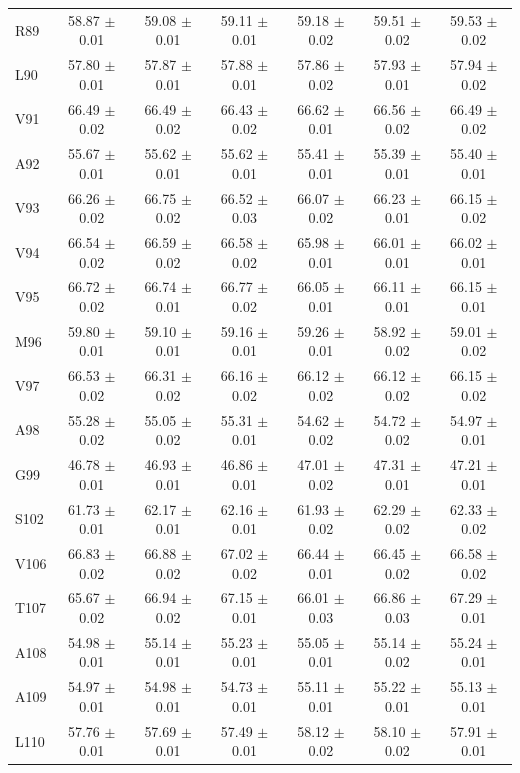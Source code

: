 \documentclass[%
 aip,
 amsmath,amssymb,
 preprint,%
]{revtex4-1}
\begin{document}
\begin{center}
\begin{longtable}{l|c|c|c|c|c|c}
R89 & 58.87 $\pm$ 0.01 & 59.08 $\pm$ 0.01 & 59.11 $\pm$ 0.01 & 59.18 $\pm$ 0.02 & 59.51 $\pm$ 0.02 & 59.53 $\pm$ 0.02 \\
L90 & 57.80 $\pm$ 0.01 & 57.87 $\pm$ 0.01 & 57.88 $\pm$ 0.01 & 57.86 $\pm$ 0.02 & 57.93 $\pm$ 0.01 & 57.94 $\pm$ 0.02 \\
V91 & 66.49 $\pm$ 0.02 & 66.49 $\pm$ 0.02 & 66.43 $\pm$ 0.02 & 66.62 $\pm$ 0.01 & 66.56 $\pm$ 0.02 & 66.49 $\pm$ 0.02 \\
A92 & 55.67 $\pm$ 0.01 & 55.62 $\pm$ 0.01 & 55.62 $\pm$ 0.01 & 55.41 $\pm$ 0.01 & 55.39 $\pm$ 0.01 & 55.40 $\pm$ 0.01 \\
V93 & 66.26 $\pm$ 0.02 & 66.75 $\pm$ 0.02 & 66.52 $\pm$ 0.03 & 66.07 $\pm$ 0.02 & 66.23 $\pm$ 0.01 & 66.15 $\pm$ 0.02 \\
V94 & 66.54 $\pm$ 0.02 & 66.59 $\pm$ 0.02 & 66.58 $\pm$ 0.02 & 65.98 $\pm$ 0.01 & 66.01 $\pm$ 0.01 & 66.02 $\pm$ 0.01 \\
V95 & 66.72 $\pm$ 0.02 & 66.74 $\pm$ 0.01 & 66.77 $\pm$ 0.02 & 66.05 $\pm$ 0.01 & 66.11 $\pm$ 0.01 & 66.15 $\pm$ 0.01 \\
M96 & 59.80 $\pm$ 0.01 & 59.10 $\pm$ 0.01 & 59.16 $\pm$ 0.01 & 59.26 $\pm$ 0.01 & 58.92 $\pm$ 0.02 & 59.01 $\pm$ 0.02 \\
V97 & 66.53 $\pm$ 0.02 & 66.31 $\pm$ 0.02 & 66.16 $\pm$ 0.02 & 66.12 $\pm$ 0.02 & 66.12 $\pm$ 0.02 & 66.15 $\pm$ 0.02 \\
A98 & 55.28 $\pm$ 0.02 & 55.05 $\pm$ 0.02 & 55.31 $\pm$ 0.01 & 54.62 $\pm$ 0.02 & 54.72 $\pm$ 0.02 & 54.97 $\pm$ 0.01 \\
G99 & 46.78 $\pm$ 0.01 & 46.93 $\pm$ 0.01 & 46.86 $\pm$ 0.01 & 47.01 $\pm$ 0.02 & 47.31 $\pm$ 0.01 & 47.21 $\pm$ 0.01 \\
S102 & 61.73 $\pm$ 0.01 & 62.17 $\pm$ 0.01 & 62.16 $\pm$ 0.01 & 61.93 $\pm$ 0.02 & 62.29 $\pm$ 0.02 & 62.33 $\pm$ 0.02 \\
V106 & 66.83 $\pm$ 0.02 & 66.88 $\pm$ 0.02 & 67.02 $\pm$ 0.02 & 66.44 $\pm$ 0.01 & 66.45 $\pm$ 0.02 & 66.58 $\pm$ 0.02 \\
T107 & 65.67 $\pm$ 0.02 & 66.94 $\pm$ 0.02 & 67.15 $\pm$ 0.01 & 66.01 $\pm$ 0.03 & 66.86 $\pm$ 0.03 & 67.29 $\pm$ 0.01 \\
A108 & 54.98 $\pm$ 0.01 & 55.14 $\pm$ 0.01 & 55.23 $\pm$ 0.01 & 55.05 $\pm$ 0.01 & 55.14 $\pm$ 0.02 & 55.24 $\pm$ 0.01 \\
A109 & 54.97 $\pm$ 0.01 & 54.98 $\pm$ 0.01 & 54.73 $\pm$ 0.01 & 55.11 $\pm$ 0.01 & 55.22 $\pm$ 0.01 & 55.13 $\pm$ 0.01 \\
L110 & 57.76 $\pm$ 0.01 & 57.69 $\pm$ 0.01 & 57.49 $\pm$ 0.01 & 58.12 $\pm$ 0.02 & 58.10 $\pm$ 0.02 & 57.91 $\pm$ 0.01 \\
\end{longtable}
\end{center}
\endgroup
\end{document}

